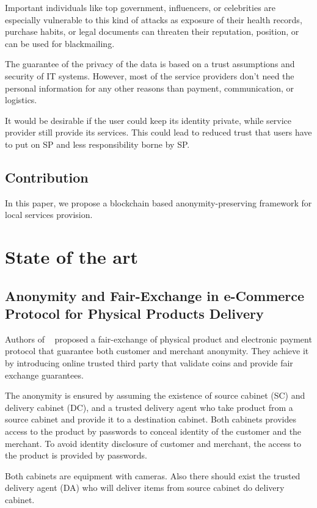 \documentclass{article}
\begin{document}
Important individuals like top government, influencers, or celebrities are especially vulnerable to this kind of attacks as exposure of their health records, purchase habits, or legal documents can threaten their reputation, position, or can be used for blackmailing.

The guarantee of the privacy of the data is based on a trust assumptions and security of IT systems. However, most of the service providers don't need the personal information for any other reasons than payment, communication, or logistics.

It would be desirable if the user could keep its identity private, while service provider still provide its services. This could lead to reduced trust that users have to put on SP and less responsibility borne by SP.

\subsection{Contribution}
In this paper, we propose a blockchain based anonymity-preserving framework for local services provision.

\section{State of the art}
\subsection{Anonymity and Fair-Exchange in e-Commerce Protocol for Physical Products Delivery}

Authors of ~\cite{birjoveanu2015anonymity} proposed a fair-exchange of physical product and electronic payment protocol that guarantee both customer and merchant anonymity. They achieve it by introducing online trusted third party that validate coins and provide fair exchange guarantees.

The anonymity is ensured by assuming the existence of source cabinet (SC) and delivery cabinet (DC), and a trusted delivery agent who take product from a source cabinet and provide it to a destination cabinet.
Both cabinets provides access to the product by passwords to conceal identity of the customer and the merchant.
To avoid identity disclosure of customer and merchant, the access to the product is provided by passwords.

Both cabinets are equipment with cameras. Also there should exist the trusted delivery agent (DA) who will deliver items from source cabinet do delivery cabinet.
\end{document}
